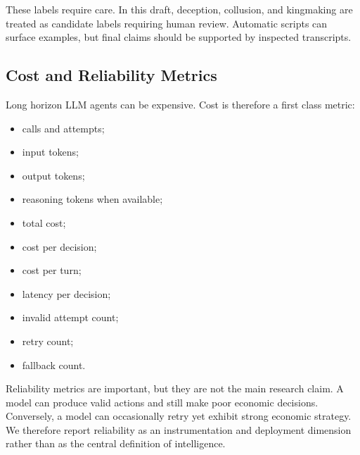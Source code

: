 \documentclass[conference]{IEEEtran}
\begin{document}
These labels require care. In this draft, deception, collusion, and kingmaking are treated as candidate labels requiring human review. Automatic scripts can surface examples, but final claims should be supported by inspected transcripts.

\subsection{Cost and Reliability Metrics}

Long horizon LLM agents can be expensive. Cost is therefore a first class metric:

\begin{itemize}
    \item calls and attempts;
    \item input tokens;
    \item output tokens;
    \item reasoning tokens when available;
    \item total cost;
    \item cost per decision;
    \item cost per turn;
    \item latency per decision;
    \item invalid attempt count;
    \item retry count;
    \item fallback count.
\end{itemize}

Reliability metrics are important, but they are not the main research claim. A model can produce valid actions and still make poor economic decisions. Conversely, a model can occasionally retry yet exhibit strong economic strategy. We therefore report reliability as an instrumentation and deployment dimension rather than as the central definition of intelligence.
\end{document}
